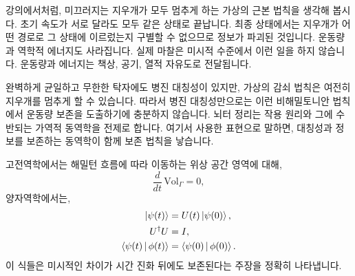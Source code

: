 \begin{classroomqa}
\end{classroomqa}

강의에서처럼, 미끄러지는 지우개가 모두 멈추게 하는 가상의 근본 법칙을 생각해 봅시다. 초기 속도가 서로 달라도 모두 같은 상태로 끝납니다. 최종 상태에서는 지우개가 어떤 경로로 그 상태에 이르렀는지 구별할 수 없으므로 정보가 파괴된 것입니다. 운동량과 역학적 에너지도 사라집니다. 실제 마찰은 미시적 수준에서 이런 일을 하지 않습니다. 운동량과 에너지는 책상, 공기, 열적 자유도로 전달됩니다.

완벽하게 균일하고 무한한 탁자에도 병진 대칭성이 있지만, 가상의 감쇠 법칙은 여전히 지우개를 멈추게 할 수 있습니다. 따라서 병진 대칭성만으로는 이런 비해밀토니안 법칙에서 운동량 보존을 도출하기에 충분하지 않습니다. 뇌터 정리는 작용 원리와 그에 수반되는 가역적 동역학을 전제로 합니다. 여기서 사용한 표현으로 말하면, 대칭성과 정보를 보존하는 동역학이 함께 보존 법칙을 낳습니다.

\begin{classroomqa}
\end{classroomqa}

\begin{classroomqa}
\end{classroomqa}

고전역학에서는 해밀턴 흐름에 따라 이동하는 위상 공간 영역에 대해,
\begin{equation}
\frac{d}{dt}\,\mathrm{Vol}_{\Gamma}=0,
\end{equation}
양자역학에서는,
\begin{equation}
\begin{aligned}
\left\lvert\psi(t)\right\rangle&=U(t)\left\lvert\psi(0)\right\rangle,\\
U^\dagger U&=I,\\
\left\langle\psi(t)\,\middle|\,\phi(t)\right\rangle
&=\left\langle\psi(0)\,\middle|\,\phi(0)\right\rangle.
\end{aligned}
\end{equation}
이 식들은 미시적인 차이가 시간 진화 뒤에도 보존된다는 주장을 정확히 나타냅니다.

